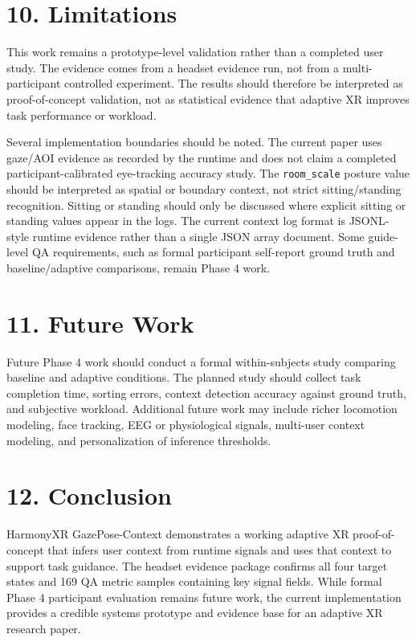 \documentclass[
  10pt,
]{article}
\begin{document}
\section{10. Limitations}\label{limitations}

This work remains a prototype-level validation rather than a completed
user study. The evidence comes from a headset evidence run, not from a
multi-participant controlled experiment. The results should therefore be
interpreted as proof-of-concept validation, not as statistical evidence
that adaptive XR improves task performance or workload.

Several implementation boundaries should be noted. The current paper
uses gaze/AOI evidence as recorded by the runtime and does not claim a
completed participant-calibrated eye-tracking accuracy study. The
\texttt{room\_scale} posture value should be interpreted as spatial or
boundary context, not strict sitting/standing recognition. Sitting or
standing should only be discussed where explicit sitting or standing
values appear in the logs. The current context log format is JSONL-style
runtime evidence rather than a single JSON array document. Some
guide-level QA requirements, such as formal participant self-report
ground truth and baseline/adaptive comparisons, remain Phase 4 work.

\section{11. Future Work}\label{future-work}

Future Phase 4 work should conduct a formal within-subjects study
comparing baseline and adaptive conditions. The planned study should
collect task completion time, sorting errors, context detection accuracy
against ground truth, and subjective workload. Additional future work
may include richer locomotion modeling, face tracking, EEG or
physiological signals, multi-user context modeling, and personalization
of inference thresholds.

\section{12. Conclusion}\label{conclusion}

HarmonyXR GazePose-Context demonstrates a working adaptive XR
proof-of-concept that infers user context from runtime signals and uses
that context to support task guidance. The headset evidence package
confirms all four target states and 169 QA metric samples containing key
signal fields. While formal Phase 4 participant evaluation remains
future work, the current implementation provides a credible systems
prototype and evidence base for an adaptive XR research paper.
\end{document}

